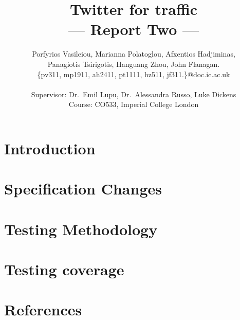 \documentclass[a4paper,11pt]{article}
\title{Twitter for traffic\\\Large{--- Report Two ---}}
\author{Porfyrios Vasileiou, Marianna Polatoglou, Afxentios Hadjiminas,\\
        Panagiotis Tsirigotis, Hanguang Zhou, John Flanagan.\\
       \{pv311, mp1911, ah2411, pt1111, hz511, jf311.\}@doc.ic.ac.uk\\ \\
       \small{Supervisor: Dr.\ Emil Lupu, Dr.\ Alessandra Russo, Luke Dickens}\\
       \small{Course: CO533, Imperial College London}
}
\begin{document}
\maketitle

\section{Introduction}
	


\section{Specification Changes}
	
\section{Testing Methodology}
	
\section{Testing coverage}
	

\section{References}
	\def\refname{}
	
	
\end{document}

